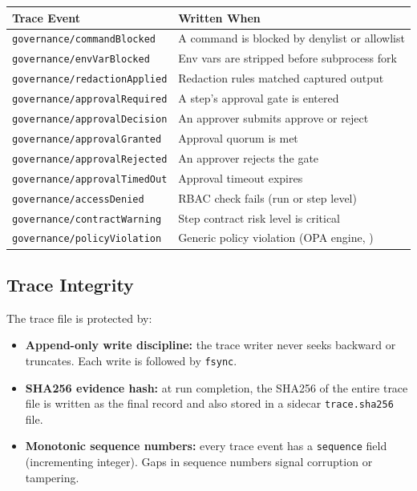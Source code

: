 \begin{center}
\begin{tabular}{ll}
\textbf{Trace Event} & \textbf{Written When} \\
\hline
\texttt{governance/commandBlocked} & A command is blocked by denylist or allowlist \\
\texttt{governance/envVarBlocked} & Env vars are stripped before subprocess fork \\
\texttt{governance/redactionApplied} & Redaction rules matched captured output \\
\texttt{governance/approvalRequired} & A step's approval gate is entered \\
\texttt{governance/approvalDecision} & An approver submits approve or reject \\
\texttt{governance/approvalGranted} & Approval quorum is met \\
\texttt{governance/approvalRejected} & An approver rejects the gate \\
\texttt{governance/approvalTimedOut} & Approval timeout expires \\
\texttt{governance/accessDenied} & RBAC check fails (run or step level) \\
\texttt{governance/contractWarning} & Step contract risk level is critical \\
\texttt{governance/policyViolation} & Generic policy violation (OPA engine, ) \\
\end{tabular}
\end{center}

\subsection{Trace Integrity}

The trace file is protected by:
\begin{itemize}
  \item \textbf{Append-only write discipline:} the trace writer never seeks backward or
        truncates. Each write is followed by \texttt{fsync}.
  \item \textbf{SHA256 evidence hash:} at run completion, the SHA256 of the entire trace
        file is written as the final record and also stored in a sidecar
        \texttt{trace.sha256} file.
  \item \textbf{Monotonic sequence numbers:} every trace event has a \texttt{sequence} field
        (incrementing integer). Gaps in sequence numbers signal corruption or tampering.
\end{itemize}

